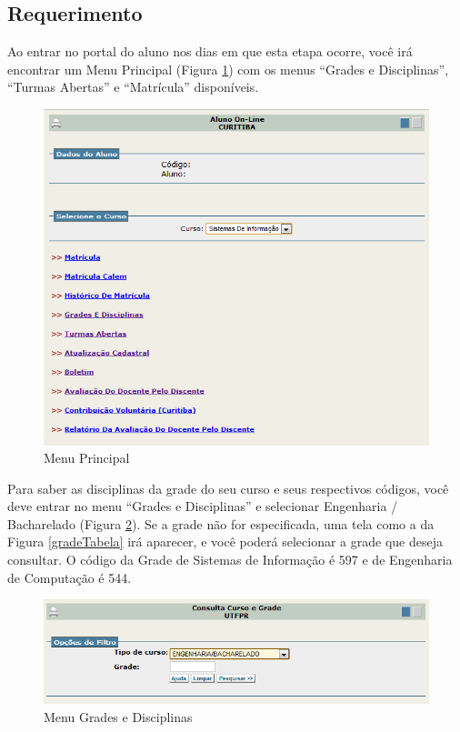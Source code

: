 \documentclass[a4paper,12pt,openany]{article}
\begin{document}
\subsection{Requerimento}

Ao entrar no portal do aluno nos dias em que esta etapa ocorre, você irá encontrar um Menu Principal (Figura \ref{menuPrincipal}) com os menus ``Grades e Disciplinas'', ``Turmas Abertas'' e ``Matrícula'' disponíveis.

	\begin{figure}[ht!]  \centering
		\includegraphics[scale=0.5]{Menu_Principal_1.png}
		\caption{Menu Principal}
		\label{menuPrincipal}
	\end{figure}

Para saber as disciplinas da grade do seu curso e seus respectivos códigos, você deve entrar no menu ``Grades e Disciplinas'' e selecionar Engenharia / Bacharelado  (Figura  \ref{gradeMenu}). Se a grade não for especificada, uma tela como a da Figura  \ref{gradeTabela} irá aparecer, e você poderá selecionar a grade que deseja consultar. O código da Grade de Sistemas de Informação é 597 e de Engenharia de Computação é 544.

	\begin{figure}[ht!]  \centering
		\includegraphics[scale=0.5]{Grade_Menu.png}
		\caption{Menu Grades e Disciplinas}
		\label{gradeMenu}
	\end{figure}
\end{document}

